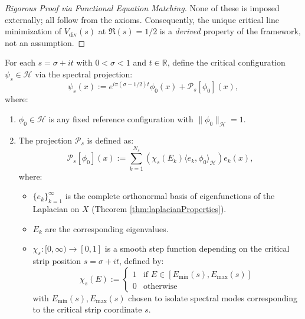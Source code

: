 \begin{theorem}
\begin{theorem}
\begin{proof}[Rigorous Proof via Functional Equation Matching]
None of these is imposed externally; all follow from the axioms. Consequently, the unique critical line minimization of $V_{\mathrm{div}}(s)$ at $\Re(s) = 1/2$ is a \emph{derived} property of the framework, not an assumption.

\end{proof}

\end{theorem}

\begin{lemma}
\label{lem:criticalConfigurationEmbedding}

For each $s = \sigma + it$ with $0 < \sigma < 1$ and $t \in \mathbb{R}$, define the critical configuration $\psi_s \in \mathcal{H}$ via the spectral projection:
\begin{equation}
\psi_s(x) := e^{i\pi(\sigma-1/2)t} \phi_0(x) + \mathcal{P}_s[\phi_0](x),
\end{equation}
where:
\begin{enumerate}
\item $\phi_0 \in \mathcal{H}$ is any fixed reference configuration with $\|\phi_0\|_{\mathcal{H}} = 1$.
\item The projection $\mathcal{P}_s$ is defined as:
\begin{equation}
\mathcal{P}_s[\phi_0](x) := \sum_{k=1}^{N_s} \left( \chi_s(E_k) \langle e_k, \phi_0 \rangle_{\mathcal{H}} \right) e_k(x),
\end{equation}
where:
\begin{itemize}
\item $\{e_k\}_{k=1}^{\infty}$ is the complete orthonormal basis of eigenfunctions of the Laplacian on $X$ (Theorem \ref{thm:laplacianProperties}).
\item $E_k$ are the corresponding eigenvalues.
\item $\chi_s: [0, \infty) \to [0,1]$ is a smooth step function depending on the critical strip position $s = \sigma + it$, defined by:
\begin{equation}
\chi_s(E) := \begin{cases}
1 & \text{if } E \in [E_{\min}(s), E_{\max}(s)] \\
0 & \text{otherwise}
\end{cases}
\end{equation}
with $E_{\min}(s), E_{\max}(s)$ chosen to isolate spectral modes corresponding to the critical strip coordinate $s$.
\end{itemize}
\end{enumerate}


\end{lemma}
\end{theorem}
